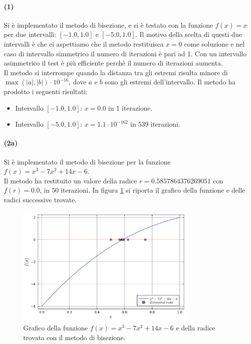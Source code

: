 \documentclass[letterpaper, 12pt]{article}
\begin{document}
\paragraph{(1) } Si è implementato il metodo di bisezione, e si è testato con la funzione $f(x)=x$ per due 
intervalli: $[-1.0, 1.0]$ e $[-5.0, 1.0]$. Il motivo della scelta di questi due intervalli è che ci aspettiamo che
il metodo restituisca $x = 0$ come soluzione e nel caso di intervallo simmetrico il numero di iterazioni 
è pari ad 1. Con un intervallo asimmetrico il test è più efficiente perchè il numero di iterazioni aumenta. \\
Il metodo si interrompe quando la distanza tra gli estremi risulta minore di $\max(|a|,|b|) \cdot 10^{-16}$,
dove $a$ e $b$ sono gli estremi dell'intervallo. Il metodo ha prodotto i seguenti risultati:
\begin{itemize}
    \item Intervallo $[-1.0, 1.0]$: $x = 0.0$ in 1 iterazione.
    \item Intervallo $[-5.0, 1.0]$: $x = 1.1 \cdot 10^{-162}$ in 539 iterazioni.
\end{itemize}

\paragraph{(2a) } Si è implementato il metodo di bisezione per la funzione $f(x) = x^3 - 7x^2 + 14x - 6$. \\
Il metodo ha restituito un valore della radice $r = 0.5857864376269051$ con $f(r) = 0.0$, in $50$ iterazioni. In
figura \ref{fig:es3_2_2_1} si riporta il grafico della funzione e delle radici successive trovate.
\begin{figure}[!ht]
    \centering
    \includegraphics[width=0.8\textwidth]{3221.pdf}
    \caption{Grafico della funzione $f(x) = x^3 - 7x^2 + 14x - 6$ e della radice trovata con il metodo di bisezione.}
    \label{fig:es3_2_2_1}
\end{figure} 
\end{document}
